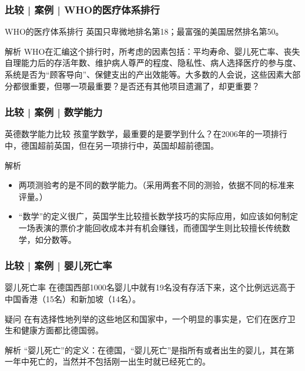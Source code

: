 \begin{frame}
  \frametitle{比较 | 案例 | WHO的医疗体系排行}
  \begin{block}{WHO的医疗体系排行}
    英国只卑微地排名第18；最富强的美国居然排名第50。
  \end{block}
  \pause
  \begin{block}{解析}
    WHO在汇编这个排行时，所考虑的因素包括：平均寿命、婴儿死亡率、丧失自理能力后的存活年数、维护病人尊严的程度、隐私性、病人选择医疗的参与度、系统是否为“顾客导向”、保健支出的产出效能等。大多数的人会说，这些因素大部分都很重要，但哪一项最重要？是否还有其他项目遗漏了，却更重要？
  \end{block}
\end{frame}

\begin{frame}
  \frametitle{比较 | 案例 | 数学能力}
  \begin{block}{英德数学能力比较}
    孩童学数学，最重要的是要学到什么？在2006年的一项排行中，德国超前英国，但在另一项排行中，英国却超前德国。
  \end{block}
  \pause \pause \pause \pause
  \begin{block}{解析}
    \begin{itemize}
      \item 两项测验考的是不同的数学能力。（采用两套不同的测验，依据不同的标准来评量。）
      \item “数学”的定义很广，英国学生比较擅长数学技巧的实际应用，如应该如何制定一场表演的票价才能回收成本并有机会赚钱，而德国学生则比较擅长传统数学，如分数等。
    \end{itemize}
  \end{block}
\end{frame}

\begin{frame}
  \frametitle{比较 | 案例 | 婴儿死亡率}
  \begin{block}{婴儿死亡率}
    在德国西部1000名婴儿中就有19名没有存活下来，这个比例远远高于中国香港（15名）和新加坡（14名）。
  \end{block}
  \pause
  \begin{block}{疑问}
    在有选择性地列举的这些地区和国家中，一个明显的事实是，它们在医疗卫生和健康方面都比德国弱。
  \end{block}
  \pause \pause \pause \pause
  \begin{block}{解析}
    “婴儿死亡”的定义：在德国，“婴儿死亡”是指所有或者出生的婴儿，其在第一年中死亡的，当然并不包括刚一出生时就已经死亡的。
  \end{block}
\end{frame}

